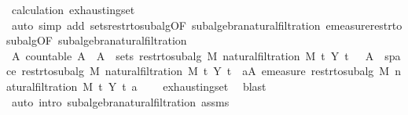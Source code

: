 \begin{isabellebody}
\ calculation{\isacharparenleft}{\kern0pt}{}{\isacharparenright}{\kern0pt}\ exhausting{\isacharunderscore}{\kern0pt}set{\isacharparenleft}{\kern0pt}{}{\isacharparenright}{\kern0pt}\ \isamarkupfalse%
\ {\isacharparenleft}{\kern0pt}auto\ simp\ add{\isacharcolon}{\kern0pt}\ sets{\isacharunderscore}{\kern0pt}restr{\isacharunderscore}{\kern0pt}to{\isacharunderscore}{\kern0pt}subalg{\isacharbrackleft}{\kern0pt}OF\ subalgebra{\isacharunderscore}{\kern0pt}natural{\isacharunderscore}{\kern0pt}filtration{\isacharbrackright}{\kern0pt}\ emeasure{\isacharunderscore}{\kern0pt}restr{\isacharunderscore}{\kern0pt}to{\isacharunderscore}{\kern0pt}subalg{\isacharbrackleft}{\kern0pt}OF\ subalgebra{\isacharunderscore}{\kern0pt}natural{\isacharunderscore}{\kern0pt}filtration{\isacharbrackright}{\kern0pt}{\isacharparenright}{\kern0pt}\isanewline
\ \ \isamarkupfalse%
\ \isamarkupfalse%
\ {\isachardoublequoteopen}{\isasymexists}A{\isachardot}{\kern0pt}\ countable\ A\ {\isasymand}\ A\ {\isasymsubseteq}\ sets\ {\isacharparenleft}{\kern0pt}restr{\isacharunderscore}{\kern0pt}to{\isacharunderscore}{\kern0pt}subalg\ M\ {\isacharparenleft}{\kern0pt}natural{\isacharunderscore}{\kern0pt}filtration\ M\ t\ Y\ t\ {\isasymand}\ {\isasymUnion}\ A\ {\isacharequal}{\kern0pt}\ space\ {\isacharparenleft}{\kern0pt}restr{\isacharunderscore}{\kern0pt}to{\isacharunderscore}{\kern0pt}subalg\ M\ {\isacharparenleft}{\kern0pt}natural{\isacharunderscore}{\kern0pt}filtration\ M\ t\ Y\ t\ {\isasymand}\ {\isacharparenleft}{\kern0pt}{\isasymforall}a{\isasymin}A{\isachardot}{\kern0pt}\ emeasure\ {\isacharparenleft}{\kern0pt}restr{\isacharunderscore}{\kern0pt}to{\isacharunderscore}{\kern0pt}subalg\ M\ {\isacharparenleft}{\kern0pt}natural{\isacharunderscore}{\kern0pt}filtration\ M\ t\ Y\ t\ a\ {\isasymnoteq}\ {\isasyminfinity}{\isacharparenright}{\kern0pt}{\isachardoublequoteclose}\ \isamarkupfalse%
\ exhausting{\isacharunderscore}{\kern0pt}set\ \isamarkupfalse%
\ blast\isanewline
{}\isamarkupfalse%
\ {\isacharparenleft}{\kern0pt}auto\ intro{\isacharcolon}{\kern0pt}\ subalgebra{\isacharunderscore}{\kern0pt}natural{\isacharunderscore}{\kern0pt}filtration\ assms{\isacharparenleft}{\kern0pt}{}{\isacharparenright}{\kern0pt}{\isacharparenright}{\kern0pt}%

\end{isabellebody}
